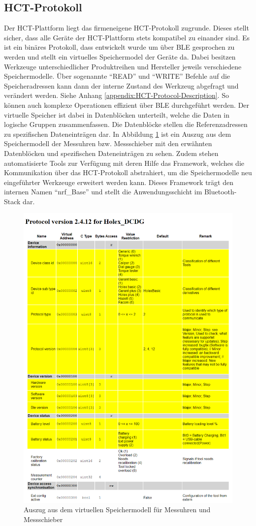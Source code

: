 \subsection{HCT-Protokoll}
Der \ac{HCT}-Plattform liegt das firmeneigene \ac{HCT}-Protokoll zugrunde. Dieses stellt sicher, dass alle Geräte der \ac{HCT}-Plattform stets kompatibel zu einander sind. Es ist ein binäres Protokoll, dass entwickelt wurde um über \ac{BLE} gesprochen zu werden und stellt ein virtuelles Speichermodel der Geräte da. Dabei besitzen Werkzeuge unterschiedlicher Produktreihen und Hersteller jeweils verschiedene Speichermodelle. Über sogenannte ``READ'' und ``WRITE'' Befehle auf die Speicheradressen kann dann der interne Zustand des Werkzeug abgefragt und verändert werden. Siehe Anhang \ref{appendix:HCT-Protocol-Description}. So können auch komplexe Operationen effizient über \ac{BLE} durchgeführt werden. Der virtuelle Speicher ist dabei in Datenblöcken unterteilt, welche die Daten in logische Gruppen zusammenfassen. Die Datenblöcke stellen die Referenzadressen zu spezifischen Dateneinträgen dar. In Abbildung \ref{fig:virtuellesSpeichermodell} ist ein Auszug aus dem Speichermodell der Messuhren bzw. Messschieber mit den erwähnten Datenblöcken und spezifischen Dateneinträgen zu sehen. Zudem stehen automatisierte Tools zur Verfügung mit deren Hilfe das Framework, welches die Kommunikation über das \ac{HCT}-Protokoll abstrahiert, um die Speichermodelle neu eingeführter Werkzeuge erweitert werden kann. Dieses Framework trägt den internen Namen ``nrf\_Base'' und stellt die Anwendungsschicht im Bluetooth-Stack dar.

\begin{figure}[H] 
	\centering
	\includegraphics[width=\textwidth]{figures/HCT_Protocol_DCDG.png}
	\caption{Auszug aus dem virtuellen Speichermodell für Messuhren und Messschieber}
	\label{fig:virtuellesSpeichermodell}
\end{figure}